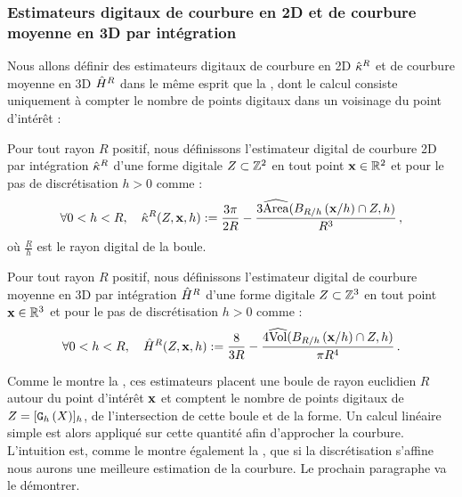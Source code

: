 \subsubsection{Estimateurs digitaux de courbure en 2D et de courbure moyenne en 3D par intégration}
%
Nous allons définir des estimateurs digitaux de courbure en 2D $\hat{\kappa}^{R}$ et de
courbure moyenne en 3D $\hat{H}^{R}$ dans le même esprit que la
, dont le calcul consiste uniquement à
compter le nombre de points digitaux dans un voisinage du point d'intérêt :
%
\begin{definition}{}\label{def:digital-2d-curvature}
  Pour tout rayon $R$ positif, nous définissons l'estimateur digital de courbure
  2D par intégration $\hat{\kappa}^{R}$ d'une forme digitale $Z \subset \mathbb{Z}^2$
  en tout point $\mathbf{x} \in \mathbb{R}^2$ et pour le pas de discrétisation $h > 0$ comme :
  \begin{equation}
    \forall 0 < h < R,\quad \hat{\kappa}^{R}(Z,\mathbf{x},h) := \frac{3\pi}{2R} - \frac{3\widehat{\mathrm{Area}}(B_{R/h}\left(\mathbf{x}/h\right) \cap Z, h)}{R^3}\,,
  \end{equation}
  où $\frac{R}{h}$ est le rayon digital de la boule.
\end{definition}
%
\begin{definition}{}\label{def:digital-3d-mean-curvature}
  Pour tout rayon $R$ positif, nous définissons l'estimateur digital de courbure
  moyenne en 3D par intégration $\hat{H}^{R}$ d'une forme digitale $Z
  \subset \mathbb{Z}^3$ en tout point $\mathbf{x} \in \mathbb{R}^3$ et pour le pas de discrétisation $h >
  0$ comme :
  \begin{equation}
    \forall 0 < h < R,\quad \hat{H}^{R}(Z,\mathbf{x},h) := \frac{8}{3R} - \frac{4\widehat{\mathrm{Vol}}(B_{R/h}\left(\mathbf{x}/h\right) \cap Z, h)}{\pi R^4}\,.
  \end{equation}
\end{definition}
%
Comme le montre la , ces estimateurs placent
une boule de rayon euclidien $R$ autour du point d'intérêt $\mathbf{x}$ et comptent le
nombre de points digitaux de $Z = \lbrack \mathtt{G}_{h}\left(X\right) \rbrack_{h}$, de l'intersection de
cette boule et de la forme. Un calcul linéaire simple est alors appliqué sur
cette quantité afin d'approcher la courbure. L'intuition est, comme le montre
également la , que si la discrétisation
s'affine nous aurons une meilleure estimation de la courbure. Le prochain
paragraphe va le démontrer.
%
